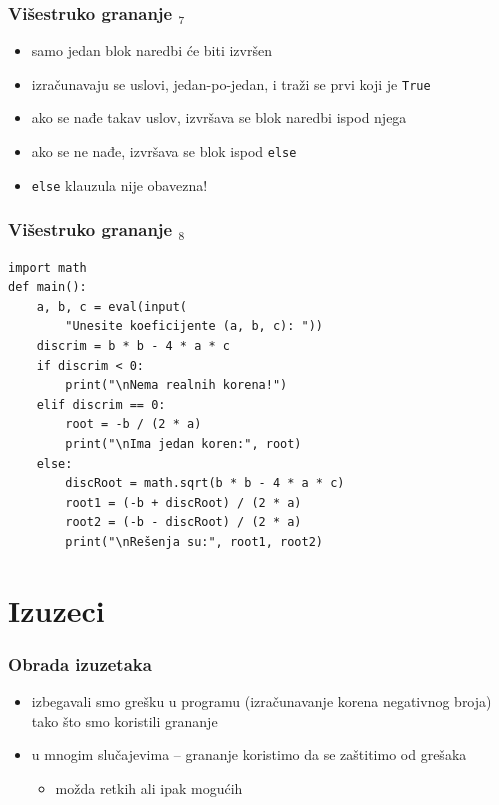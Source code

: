 \documentclass[utf8,compress,aspectratio=169]{beamer}
\begin{document}
\begin{frame}[fragile]
  \frametitle{Višestruko grananje $_7$}
  \begin{itemize}
    \item samo jedan blok naredbi će biti izvršen
    \item izračunavaju se uslovi, jedan-po-jedan, i traži se prvi koji je \texttt{True}
    \item ako se nađe takav uslov, izvršava se blok naredbi ispod njega
    \item ako se ne nađe, izvršava se blok ispod \texttt{else}
    \item \texttt{else} klauzula nije obavezna!
  \end{itemize}
\end{frame}

\begin{frame}[fragile,shrink=5]
  \frametitle{Višestruko grananje $_8$}
\begin{verbatim}
import math
def main():
    a, b, c = eval(input(
        "Unesite koeficijente (a, b, c): "))
    discrim = b * b - 4 * a * c
    if discrim < 0:
        print("\nNema realnih korena!")
    elif discrim == 0:
        root = -b / (2 * a)
        print("\nIma jedan koren:", root)
    else:
        discRoot = math.sqrt(b * b - 4 * a * c)
        root1 = (-b + discRoot) / (2 * a)
        root2 = (-b - discRoot) / (2 * a)
        print("\nRešenja su:", root1, root2)
\end{verbatim}
\end{frame}

\section{Izuzeci}

\begin{frame}[fragile]
  \frametitle{Obrada izuzetaka}
  \begin{itemize}
    \item izbegavali smo grešku u programu (izračunavanje korena negativnog broja) tako što smo koristili grananje
    \item u mnogim slučajevima -- grananje koristimo da se zaštitimo od grešaka
    \begin{itemize}
      \item možda retkih ali ipak mogućih
    \end{itemize}
  \end{itemize}
\end{frame}
\end{document}
